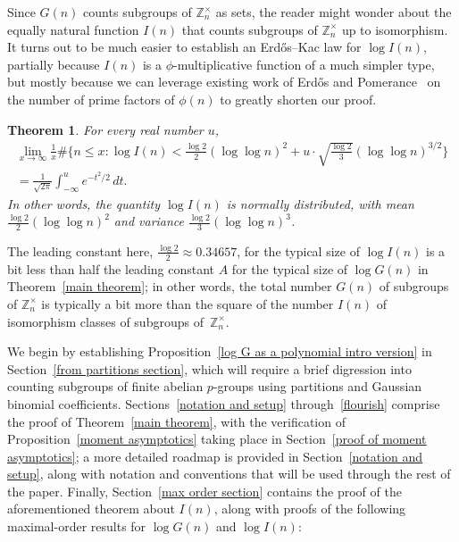 \documentclass[12pt,reqno]{amsart}
\newtheorem{theorem}{Theorem}[section]
\theoremstyle{definition}
\newcommand{\ep}{\varepsilon}
\newcommand{\Z}{{\mathbb Z}}
\newcommand{\Znt}{{\Z_n^\times}}
\begin{document}
Since $G(n)$ counts subgroups of $\Znt$ as sets, the reader might wonder about the equally natural function $I(n)$ that counts subgroups of $\Znt$ up to isomorphism. It turns out to be much easier to establish an Erd{\H o}s--Kac law for $\log I(n)$, partially because $I(n)$ is a $\phi$-multiplicative function of a much simpler type, but mostly because we can leverage existing work of Erd{\H o}s and Pomerance~\cite{ep85} on the number of prime factors of $\phi(n)$ to greatly shorten our proof.

\begin{theorem}  \label{logIn EK thm}
For every real number $u$,
\begin{multline*}
\lim_{x \to \infty} \frac{1}{x} \#\bigg\{n \leq x \colon \log I(n) < \frac{\log 2}{2}(\log\log n)^2 + u\cdot \sqrt{\frac{\log 2}{3}} (\log\log n)^{3/2} \bigg\} \\
= \frac{1}{\sqrt{2\pi}} \int_{-\infty}^u e^{-t^2/2} \, dt.
\end{multline*}
In other words, the quantity $\log I(n)$ is normally distributed, with mean $\frac{\log 2}{2} (\log\log n)^2$ and variance $\frac{\log 2}{3}(\log\log n)^3$.
\end{theorem}

\noindent The leading constant here, $\frac{\log2}2 \approx 0.34657$, for the typical size of $\log I(n)$ is a bit less than half the leading constant $A$ for the typical size of $\log G(n)$ in Theorem~\ref{main theorem}; in other words, the total number $G(n)$ of subgroups of $\Znt$ is typically a bit more than the square of the number $I(n)$ of isomorphism classes of subgroups of~$\Znt$.

We begin by establishing Proposition~\ref{log G as a polynomial intro version} in Section~\ref{from partitions section}, which will require a brief digression into counting subgroups of finite abelian $p$-groups using partitions and Gaussian binomial coefficients. Sections~\ref{notation and setup} through~\ref{flourish} comprise the proof of Theorem~\ref{main theorem}, with the verification of Proposition~\ref{moment asymptotics} taking place in Section~\ref{proof of moment asymptotics}; a more detailed roadmap is provided in Section~\ref{notation and setup}, along with notation and conventions that will be used through the rest of the paper. Finally, Section~\ref{max order section} contains the proof of the aforementioned theorem about $I(n)$, along with proofs of the following maximal-order results for $\log G(n)$ and $\log I(n)$:

\end{document}
